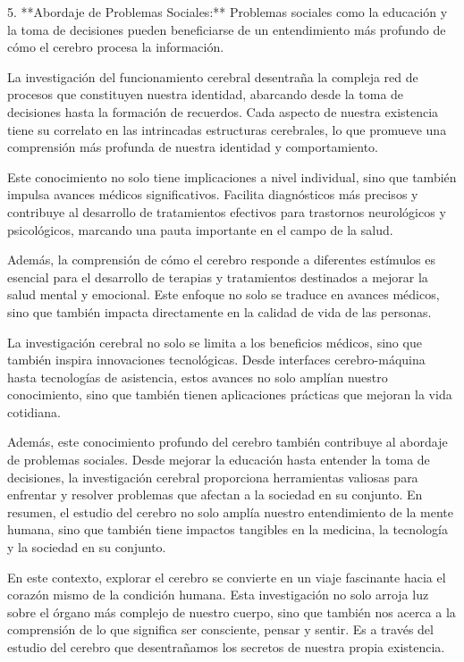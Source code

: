 \documentclass[12pt,oneside]{uhthesis}
\begin{document}
5. **Abordaje de Problemas Sociales:** Problemas sociales como la educación y la toma de decisiones pueden beneficiarse de un entendimiento más profundo de cómo el cerebro procesa la información.

La investigación del funcionamiento cerebral desentraña la compleja red de procesos que constituyen nuestra identidad, abarcando desde la toma de decisiones hasta la formación de recuerdos. Cada aspecto de nuestra existencia tiene su correlato en las intrincadas estructuras cerebrales, lo que promueve una comprensión más profunda de nuestra identidad y comportamiento.

Este conocimiento no solo tiene implicaciones a nivel individual, sino que también impulsa avances médicos significativos. Facilita diagnósticos más precisos y contribuye al desarrollo de tratamientos efectivos para trastornos neurológicos y psicológicos, marcando una pauta importante en el campo de la salud.

Además, la comprensión de cómo el cerebro responde a diferentes estímulos es esencial para el desarrollo de terapias y tratamientos destinados a mejorar la salud mental y emocional. Este enfoque no solo se traduce en avances médicos, sino que también impacta directamente en la calidad de vida de las personas.

La investigación cerebral no solo se limita a los beneficios médicos, sino que también inspira innovaciones tecnológicas. Desde interfaces cerebro-máquina hasta tecnologías de asistencia, estos avances no solo amplían nuestro conocimiento, sino que también tienen aplicaciones prácticas que mejoran la vida cotidiana.

Además, este conocimiento profundo del cerebro también contribuye al abordaje de problemas sociales. Desde mejorar la educación hasta entender la toma de decisiones, la investigación cerebral proporciona herramientas valiosas para enfrentar y resolver problemas que afectan a la sociedad en su conjunto. En resumen, el estudio del cerebro no solo amplía nuestro entendimiento de la mente humana, sino que también tiene impactos tangibles en la medicina, la tecnología y la sociedad en su conjunto.

En este contexto, explorar el cerebro se convierte en un viaje fascinante hacia el corazón mismo de la condición humana. Esta investigación no solo arroja luz sobre el órgano más complejo de nuestro cuerpo, sino que también nos acerca a la comprensión de lo que significa ser consciente, pensar y sentir. Es a través del estudio del cerebro que desentrañamos los secretos de nuestra propia existencia.
\end{document}
